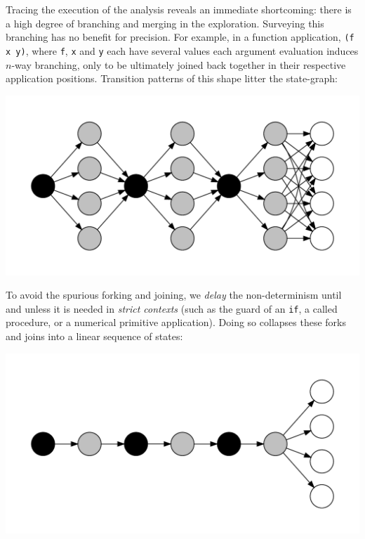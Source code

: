 \documentclass[9pt]{sigplanconf} %
\begin{document}
Tracing the execution of the analysis reveals an immediate shortcoming: there is a high degree of branching and merging in the exploration.
%
Surveying this branching has no benefit for precision.
%
For example, in a function application, {\tt (f x y)}, where {\tt f}, {\tt x} and {\tt y} each have several values each argument evaluation induces $n$-way branching, only to be ultimately joined back together in their respective application positions.
%
Transition patterns of this shape litter the state-graph:
%
\vspace{-1em}
\begin{center}
\includegraphics[scale=0.2]{fanoutdot2}
\end{center}
\vspace{-1em}
To avoid the spurious forking and joining, we {\it delay} the non-determinism until and unless it is needed in {\it strict contexts} (such as the guard of an {\tt if}, a called procedure, or a numerical primitive application).
%
Doing so collapses these forks and joins into a linear sequence of states:
\vspace{-1em}
\begin{center}
\includegraphics[scale=0.2]{lazydot}
\end{center}
\vspace{-1em}
\end{document}
